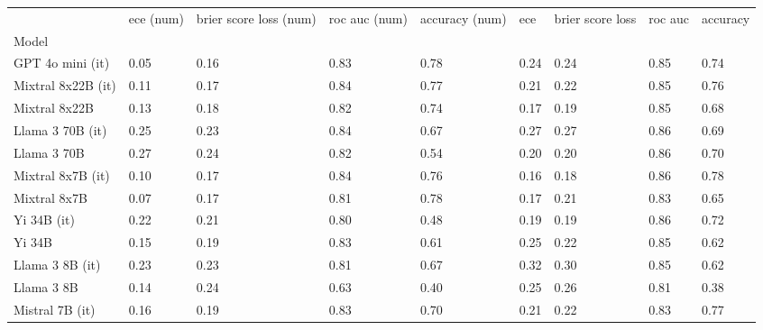 \begin{tabular}{lllllllll}
\toprule
 & ece (num) & brier score loss (num) & roc auc (num) & accuracy (num) & ece & brier score loss & roc auc & accuracy \\
Model &  &  &  &  &  &  &  &  \\
\midrule
GPT 4o mini (it) & \cellcolor{cyan!25.0} 0.05 & \cellcolor{cyan!25.0} 0.16 & \cellcolor{cyan!20.6} 0.83 & \cellcolor{cyan!24.4} 0.78 & 0.24 & 0.24 & \cellcolor{cyan!17.6} 0.85 & 0.74 \\
Mixtral 8x22B (it) & 0.11 & \cellcolor{cyan!15.5} 0.17 & \cellcolor{cyan!25.0} 0.84 & \cellcolor{cyan!18.9} 0.77 & 0.21 & \cellcolor{cyan!3.6} 0.22 & \cellcolor{cyan!11.2} 0.85 & \cellcolor{cyan!11.1} 0.76 \\
Mixtral 8x22B & 0.13 & \cellcolor{cyan!3.6} 0.18 & \cellcolor{cyan!9.6} 0.82 & \cellcolor{cyan!2.4} 0.74 & \cellcolor{cyan!13.2} 0.17 & \cellcolor{cyan!21.6} 0.19 & \cellcolor{cyan!16.5} 0.85 & 0.68 \\
Llama 3 70B (it) & 0.25 & 0.23 & \cellcolor{cyan!22.1} 0.84 & 0.67 & 0.27 & 0.27 & \cellcolor{cyan!25.0} 0.86 & 0.69 \\
Llama 3 70B & 0.27 & 0.24 & \cellcolor{cyan!6.7} 0.82 & 0.54 & 0.20 & \cellcolor{cyan!14.9} 0.20 & \cellcolor{cyan!20.8} 0.86 & 0.70 \\
Mixtral 8x7B (it) & 0.10 & \cellcolor{cyan!15.5} 0.17 & \cellcolor{cyan!22.8} 0.84 & \cellcolor{cyan!12.8} 0.76 & \cellcolor{cyan!16.8} 0.16 & \cellcolor{cyan!25.0} 0.18 & \cellcolor{cyan!19.7} 0.86 & \cellcolor{cyan!25.0} 0.78 \\
Mixtral 8x7B & \cellcolor{cyan!4.0} 0.07 & \cellcolor{cyan!13.1} 0.17 & \cellcolor{cyan!3.7} 0.81 & \cellcolor{cyan!25.0} 0.78 & \cellcolor{cyan!10.6} 0.17 & \cellcolor{cyan!11.5} 0.21 & 0.83 & 0.65 \\
Yi 34B (it) & 0.22 & 0.21 & 0.80 & 0.48 & \cellcolor{cyan!1.3} 0.19 & \cellcolor{cyan!18.8} 0.19 & \cellcolor{cyan!19.7} 0.86 & 0.72 \\
Yi 34B & 0.15 & 0.19 & \cellcolor{cyan!17.7} 0.83 & 0.61 & 0.25 & \cellcolor{cyan!2.5} 0.22 & \cellcolor{cyan!13.3} 0.85 & 0.62 \\
Llama 3 8B (it) & 0.23 & 0.23 & \cellcolor{cyan!0.1} 0.81 & 0.67 & 0.32 & 0.30 & \cellcolor{cyan!13.3} 0.85 & 0.62 \\
Llama 3 8B & 0.14 & 0.24 & 0.63 & \cellcolor{orange!3.7} 0.40 & 0.25 & 0.26 & 0.81 & \cellcolor{orange!20.8} 0.38 \\
Mistral 7B (it) & 0.16 & 0.19 & \cellcolor{cyan!14.7} 0.83 & 0.70 & 0.21 & \cellcolor{cyan!4.7} 0.22 & 0.83 & \cellcolor{cyan!16.5} 0.77 \\

\end{tabular}
